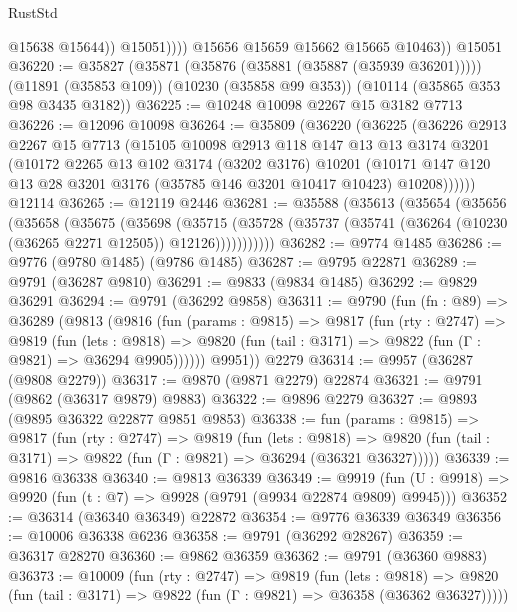 \begin{lexlean}{RustStd}
\begin{coremodule}
                    @15638
                    @15644))
                @15051))))
        @15656
        @15659
        @15662
        @15665
        @10463))
    @15051
@36220 := @35827
    (@35871 (@35876 (@35881 (@35887 (@35939 @36201)))))
    (@11891 (@35853 @109))
    (@10230 (@35858 @99 @353))
    (@10114 (@35865 @353 @98 @3435 @3182))
@36225 := @10248 @10098 @2267 @15 @3182 @7713
@36226 := @12096 @10098
@36264 := @35809
    (@36220
      (@36225
        (@36226
          @2913
          @2267
          @15
          @7713
          (@15105
            @10098
            @2913
            @118
            @147
            @13
            @13
            @3174
            @3201
            (@10172
              @2265
              @13
              @102
              @3174
              (@3202 @3176)
              @10201
              (@10171 @147 @120 @13 @28 @3201 @3176 (@35785 @146 @3201 @10417 @10423) @10208))))))
    @12114
@36265 := @12119 @2446
@36281 := @35588
    (@35613
      (@35654
        (@35656
          (@35658
            (@35675
              (@35698
                (@35715
                  (@35728 (@35737 (@35741 (@36264 (@10230 (@36265 @2271 @12505)) @12126)))))))))))
@36282 := @9774 @1485
@36286 := @9776 (@9780 @1485) (@9786 @1485)
@36287 := @9795 @22871
@36289 := @9791 (@36287 @9810)
@36291 := @9833 (@9834 @1485)
@36292 := @9829 @36291
@36294 := @9791 (@36292 @9858)
@36311 := @9790
    (fun (fn : @89) =>
    @36289
      (@9813
        (@9816
          (fun (params : @9815) =>
          @9817
            (fun (rty : @2747) =>
            @9819
              (fun (lets : @9818) =>
              @9820 (fun (tail : @3171) => @9822 (fun (Γ : @9821) => @36294 @9905))))))
        @9951))
    @2279
@36314 := @9957 (@36287 (@9808 @2279))
@36317 := @9870 (@9871 @2279) @22874
@36321 := @9791 (@9862 (@36317 @9879) @9883)
@36322 := @9896 @2279
@36327 := @9893 (@9895 @36322 @22877 @9851 @9853)
@36338 := fun (params : @9815) =>
  @9817
    (fun (rty : @2747) =>
    @9819
      (fun (lets : @9818) =>
      @9820 (fun (tail : @3171) => @9822 (fun (Γ : @9821) => @36294 (@36321 @36327)))))
@36339 := @9816 @36338
@36340 := @9813 @36339
@36349 := @9919
    (fun (U : @9918) => @9920 (fun (t : @7) => @9928 (@9791 (@9934 @22874 @9809) @9945)))
@36352 := @36314 (@36340 @36349) @22872
@36354 := @9776 @36339 @36349
@36356 := @10006 @36338 @6236
@36358 := @9791 (@36292 @28267)
@36359 := @36317 @28270
@36360 := @9862 @36359
@36362 := @9791 (@36360 @9883)
@36373 := @10009
    (fun (rty : @2747) =>
    @9819
      (fun (lets : @9818) =>
      @9820 (fun (tail : @3171) => @9822 (fun (Γ : @9821) => @36358 (@36362 @36327)))))

\end{coremodule}
\end{lexlean}

